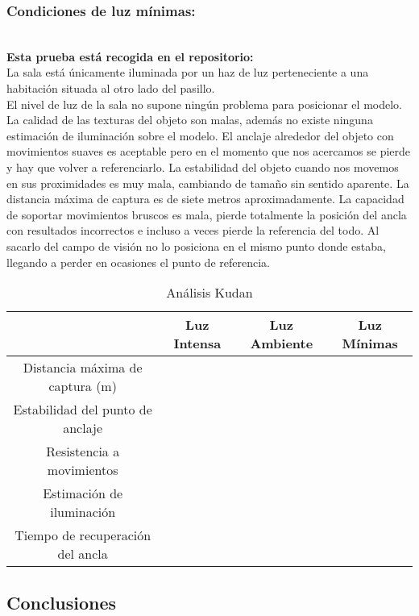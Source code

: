 \subsubsection{Condiciones de luz mínimas:}\\
\textbf{Esta prueba está recogida en el repositorio:}\\
La sala está únicamente iluminada por un haz de luz perteneciente a una habitación situada al otro lado del pasillo.\\

El nivel de luz de la sala no supone ningún problema para posicionar el modelo. La calidad de las texturas del objeto son malas, además no existe ninguna estimación de iluminación sobre el modelo. El anclaje alrededor del objeto con movimientos suaves es aceptable pero en el momento que nos acercamos se pierde y hay que volver a referenciarlo. La estabilidad del objeto cuando nos movemos en sus proximidades es muy mala, cambiando de tamaño sin sentido aparente. La distancia máxima de captura es de siete metros aproximadamente. La capacidad de soportar movimientos bruscos es mala, pierde totalmente la posición del ancla con resultados incorrectos e incluso a veces pierde la referencia del todo. Al sacarlo del campo de visión no lo posiciona en el mismo punto donde estaba, llegando a perder en ocasiones el punto de referencia.

\begin{table}[H]
\resizebox{\textwidth}{!} {
    \centering
    \begin{tabular}{|c|c|c|c|}
    \hline
         & Luz Intensa & Luz Ambiente & Luz Mínimas \\
         \hline
        Distancia máxima de captura (m) & & &\\
        \hline
        Estabilidad del punto de anclaje & & &\\
        \hline
        Resistencia a movimientos & & & \\
        \hline
        Estimación de iluminación & & & \\
        \hline
        Tiempo de recuperación del ancla & & & \\
      \hline
    \end{tabular}
  }
    \caption{Análisis Kudan}
    \label{tab:TKudan}
\end{table}
\subsection{Conclusiones}


